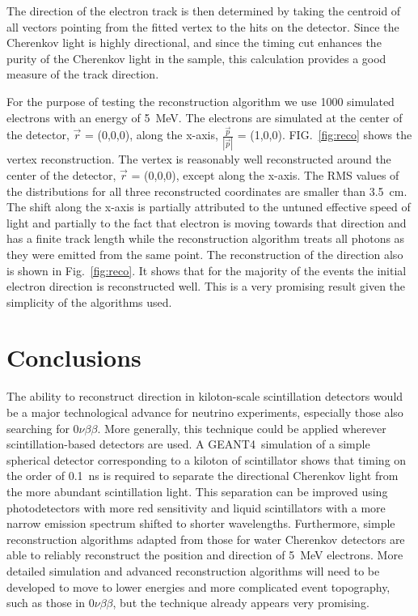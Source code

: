 \documentclass[aps,prc,twocolumn,groupedaddress,showpacs,amsmath,amssymb,floatfix,superscriptaddress]{revtex4}
\newcommand{\GEANT}{GEANT4}
\begin{document}
The direction of the electron track is then determined by taking the
centroid of all vectors pointing from the fitted vertex to the hits on
the detector. Since the Cherenkov light is highly directional, and
since the timing cut enhances the purity of the Cherenkov light in the
sample, this calculation provides a good measure of the track
direction. 

For the purpose of testing the reconstruction algorithm we use 1000
simulated electrons with an energy of 5~MeV. The electrons are
simulated at the center of the detector, $\vec{r}$ = (0,0,0), along
the x-axis, $\frac{\vec{p}}{|\vec{p}|}$ = (1,0,0). FIG.~\ref{fig:reco}
shows the vertex reconstruction. The vertex is reasonably well
reconstructed around the center of the detector, $\vec{r}$ = (0,0,0),
except along the x-axis. The RMS values of the distributions for all three
reconstructed coordinates are smaller than 3.5~cm. The shift along the
x-axis is partially attributed to the untuned effective speed of light
and partially to the fact that electron is moving towards that
direction and has a finite track length while the reconstruction
algorithm treats all photons as they were emitted from the same point.
The reconstruction of the direction also is shown in
Fig.~\ref{fig:reco}. It shows that for the majority of the events the
initial electron direction is reconstructed well. This is a very promising
result given the simplicity of the algorithms used.

\section{Conclusions}
The ability to reconstruct direction in kiloton-scale scintillation
detectors would be a major technological advance for neutrino
experiments, especially those also
searching for $0\nu\beta\beta$. More generally, this technique could
be applied wherever scintillation-based detectors are used. A \GEANT~simulation of a simple spherical detector corresponding to a kiloton
of scintillator shows that timing on the order of 0.1~ns is required
to separate the directional Cherenkov light from the more abundant
scintillation light. This separation can be improved using
photodetectors with more red sensitivity and liquid scintillators with
a more narrow emission spectrum shifted to shorter
wavelengths. Furthermore, simple reconstruction algorithms adapted
from those for water Cherenkov detectors are able to reliably
reconstruct the position and direction of 5~MeV electrons. More
detailed simulation and advanced reconstruction algorithms will need
to be developed to move to lower energies and more complicated event
topography, such as those in $0\nu\beta\beta$, but the technique already
appears very promising.
\end{document}
